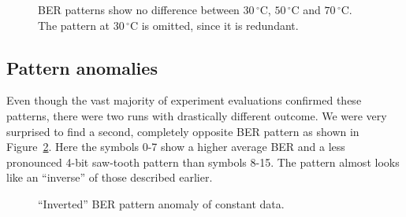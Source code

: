 \begin{figure}[hb]
	\caption{\acl{BER} patterns show no difference between $30\,^{\circ}\mathrm{C}$, $50\,^{\circ}\mathrm{C}$ and $70\,^{\circ}\mathrm{C}$. The pattern at $30\,^{\circ}\mathrm{C}$ is omitted, since it is redundant.}
	\label{fig:temperature_bit_errors}
\end{figure}


\subsection{Pattern anomalies}
\label{subsec:pattern_anomalies}

Even though the vast majority of experiment evaluations confirmed these patterns, there were two runs with  drastically different outcome.
We were very surprised to find a second, completely opposite \ac{BER} pattern as shown in Figure~\ref{fig:anomalie_bit_error}.
Here the symbols 0-7 show a higher average \ac{BER} and a less pronounced 4-bit saw-tooth pattern than symbols 8-15.
The pattern almost looks like an ``inverse'' of those described earlier.

\begin{figure}[t]
	\caption{``Inverted'' \acs{BER} pattern anomaly of constant data.}
	\label{fig:anomalie_bit_error}
\end{figure}

